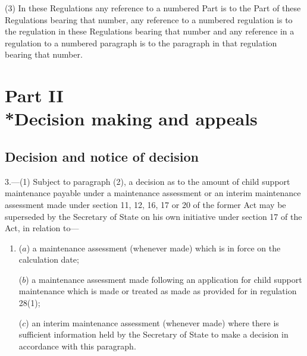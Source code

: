 \documentclass[12pt,a4paper]{article}
\begin{document}
(3) In these Regulations any reference to a numbered Part is to the Part of these Regulations bearing that number, any reference to a numbered regulation is to the regulation in these Regulations bearing that number and any reference in a regulation to a numbered paragraph is to the paragraph in that regulation bearing that number.


\section[Part II --- Decision making and appeals]{Part II\\*Decision making and appeals}

\renewcommand\parthead{--- Part II}

\subsection[3. Decision and notice of decision]{Decision and notice of decision}

3.---(1)  Subject to paragraph (2), a decision as to the amount of child support maintenance payable under a maintenance assessment or an interim maintenance assessment made under section 11, 12, 16, 17 or 20 of the former Act may be superseded by the Secretary of State on his own initiative under section 17 of the Act, in relation to—
\begin{enumerate}\item[]
($a$) a maintenance assessment (whenever made) which 
is in force on the calculation date;

($b$) a maintenance assessment made following an application for child support maintenance which is made or treated as made as provided for in regulation 28(1);

($c$) an interim maintenance assessment 
(whenever made)  %
where there is sufficient information held by the Secretary of State to make a decision in accordance with this paragraph.
\end{enumerate}
\end{document}
